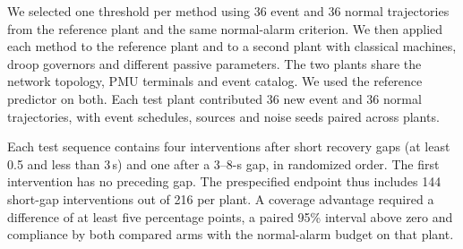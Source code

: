 We selected one threshold per method using 36 event and 36 normal
trajectories from the reference plant and the same normal-alarm criterion.
We then applied each method to the reference plant and to a second plant
with classical machines, droop governors and different passive parameters.
The two plants share the network topology, PMU terminals and event catalog.
We used the reference predictor on both. Each test
plant contributed 36 new event and 36 normal trajectories, with event
schedules, sources and noise seeds paired across plants.

Each test sequence contains four interventions after short recovery gaps
(at least 0.5 and less than 3\,s) and one after a
3--8-s gap, in randomized order. The first intervention has no preceding
gap. The prespecified endpoint thus includes 144 short-gap interventions
out of 216 per plant. A coverage advantage required a difference of at
least five percentage points, a paired 95\% interval above zero and
compliance by both compared arms with the normal-alarm budget on that plant.

